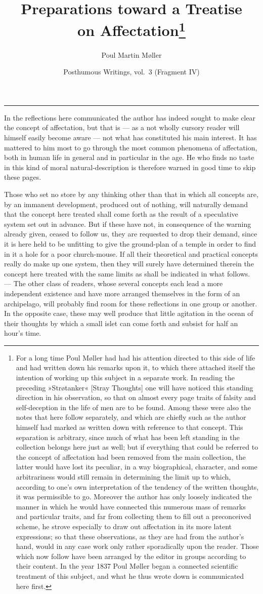 \documentclass[12pt]{article}
\title{\textbf{Preparations toward a Treatise\\[0.2em] on Affectation}\footnote{For a long time Poul Møller had had his attention directed to this side of life and had written down his remarks upon it, to which there attached itself the intention of working up this subject in a separate work. In reading the preceding »Strøtanker« [Stray Thoughts] one will have noticed this standing direction in his observation, so that on almost every page traits of falsity and self-deception in the life of men are to be found. Among these were also the notes that here follow separately, and which are chiefly such as the author himself had marked as written down with reference to that concept. This separation is arbitrary, since much of what has been left standing in the collection belongs here just as well; but if everything that could be referred to the concept of affectation had been removed from the main collection, the latter would have lost its peculiar, in a way biographical, character, and some arbitrariness would still remain in determining the limit up to which, according to one's own interpretation of the tendency of the written thoughts, it was permissible to go. Moreover the author has only loosely indicated the manner in which he would have connected this numerous mass of remarks and particular traits, and far from collecting them to fill out a preconceived scheme, he strove especially to draw out affectation in its more latent expressions; so that these observations, as they are had from the author's hand, would in any case work only rather sporadically upon the reader. Those which now follow have been arranged by the editor in groups according to their content. In the year 1837 Poul Møller began a connected scientific treatment of this subject, and what he thus wrote down is communicated here first.}}
\author{Poul Martin Møller}
\date{Posthumous Writings, vol.\ 3 (Fragment IV)}
\newcommand{\opage}[1]{\marginnote{\footnotesize\textit{[#1]}}}
\begin{document}
\maketitle

\begin{center}\rule{0.32\textwidth}{0.4pt}\end{center}
\medskip

\opage{163}In the reflections here communicated the author has indeed sought to make clear the concept of affectation, but that is --- as a not \opage{164}wholly cursory reader will himself easily become aware --- not what has constituted his main interest. It has mattered to him most to go through the most common phenomena of affectation, both in human life in general and in particular in the age. He who finds no taste in this kind of moral natural-description is therefore warned in good time to skip these pages.

Those who set no store by any thinking other than that in which all concepts are, by an immanent development, produced out of nothing, will naturally demand that the concept here treated shall come forth as the result of a speculative system set out in advance. But if these have not, in consequence of the warning already given, ceased to follow us, they are requested to drop their demand, since it is here held to be unfitting to give the ground-plan of a temple in order to find in it a hole for a poor church-mouse. If all their theoretical and practical concepts really do make up one system, then they will surely have determined therein the concept here treated with the same limits as shall be indicated in what follows. --- The other class of readers, whose several concepts each lead a more independent existence and have more arranged themselves in the form of an archipelago, will probably find room for these reflections in one group or another. In the opposite case, these may well produce that little agitation in the ocean of their thoughts by which a small islet can come forth and subsist for half an hour's time.
\end{document}
